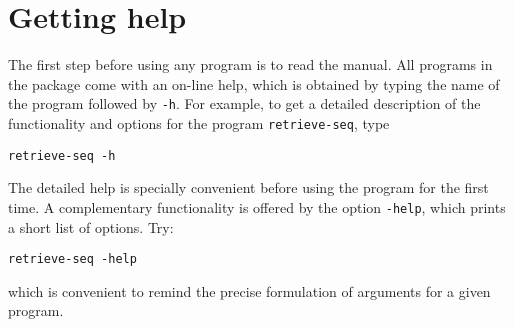 \section{Getting help} 

The first step before using any program is to read the manual. All
programs in the \RSAT package come with an on-line help, which
is obtained by typing the name of the program followed by
\texttt{-h}. For example, to get a detailed description of the
functionality and options for the program \texttt{retrieve-seq}, type

\begin{verbatim}
retrieve-seq -h
\end{verbatim}

The detailed help is specially convenient before using the program for
the first time. A complementary functionality is offered by the option
\texttt{-help}, which prints a short list of options. Try:

\begin{verbatim}
retrieve-seq -help
\end{verbatim}

which is convenient to remind the precise formulation of arguments for
a given program.


